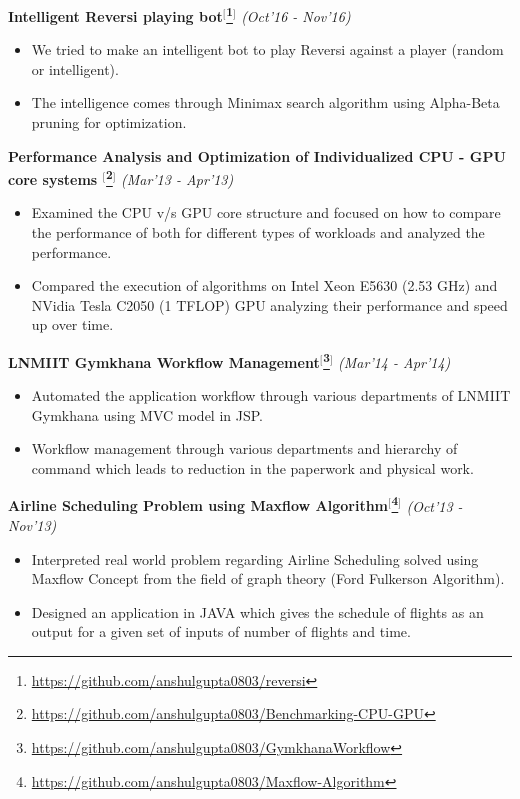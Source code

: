 \documentclass[a4paper,10pt]{article}
\begin{document}
\indent\small{\textbf{Intelligent Reversi playing bot$^[$\footnote{\href{https://github.com/anshulgupta0803/reversi}{https://github.com/anshulgupta0803/reversi}}$^]$}}	\hfill	\small{\textit{(Oct'16 - Nov'16)}}
\begin{itemize}
 \item We tried to make an intelligent bot to play Reversi against a player (random or intelligent).
 \item The intelligence comes through Minimax search algorithm using Alpha-Beta pruning for optimization.
\end{itemize}

\indent\small{\textbf{Performance Analysis and Optimization of Individualized CPU - GPU core systems $^[$\footnote{\href{https://github.com/anshulgupta0803/Benchmarking-CPU-GPU}{https://github.com/anshulgupta0803/Benchmarking-CPU-GPU}}$^]$}}	\hfill	\small{\textit{(Mar'13 - Apr'13)}}
\begin{itemize}
 \item Examined the CPU v/s GPU core structure and focused on how to compare the performance of both for different types of workloads and analyzed the performance.
 \item Compared the execution of algorithms on Intel Xeon E5630 (2.53 GHz) and NVidia Tesla C2050 (1 TFLOP) GPU analyzing their performance and speed up over time.
\end{itemize}

\indent\small{\textbf{LNMIIT Gymkhana Workflow Management$^[$\footnote{\href{https://github.com/anshulgupta0803/GymkhanaWorkflow}{https://github.com/anshulgupta0803/GymkhanaWorkflow}}$^]$}}	\hfill	\small{\textit{(Mar'14 - Apr'14)}}
\begin{itemize}
 \item Automated the application workflow through various departments of LNMIIT Gymkhana using MVC model in JSP.
 \item Workflow management through various departments and hierarchy of command which leads to reduction in the paperwork and physical work.
\end{itemize}

\indent\small{\textbf{Airline Scheduling Problem using Maxflow Algorithm$^[$\footnote{\href{https://github.com/anshulgupta0803/Maxflow-Algorithm}{https://github.com/anshulgupta0803/Maxflow-Algorithm}}$^]$}}	\hfill	\small{\textit{(Oct'13 - Nov'13)}}
\begin{itemize}
 \item  Interpreted real world problem regarding Airline Scheduling solved using Maxflow Concept from the field of graph theory (Ford Fulkerson Algorithm).
 \item Designed an application in JAVA which gives the schedule of flights as an output for a given set of inputs of number of flights and time.
\end{itemize}
\end{document}
